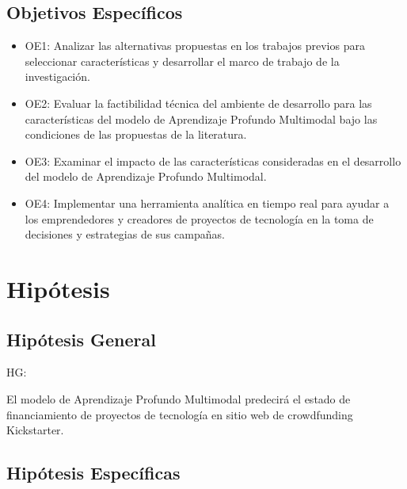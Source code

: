 \subsection{Objetivos Específicos}
\newcommand{\Objone}{
Analizar las alternativas propuestas en los trabajos previos para seleccionar características y desarrollar el marco de trabajo de la investigación.
}
\newcommand{\Objtwo}{
Evaluar la factibilidad técnica del ambiente de desarrollo para las características del modelo de Aprendizaje Profundo Multimodal bajo las condiciones de las propuestas de la literatura.
}
\newcommand{\Objthree}{
Examinar el impacto de las características consideradas en el desarrollo del modelo de Aprendizaje Profundo Multimodal.
}
\newcommand{\Objfour}{
Implementar una herramienta analítica en tiempo real para ayudar a los emprendedores y creadores de proyectos de tecnología en la toma de decisiones y estrategias de sus campañas.
}

\begin{itemize}
	\item OE1: {\Objone}
	\item OE2: {\Objtwo}
	\item OE3: {\Objthree}
	\item OE4: {\Objfour}
\end{itemize}

\section{Hipótesis}

\subsection{Hipótesis General}
HG: \newcommand{\HipotesisGeneral}{
	El modelo de Aprendizaje Profundo Multimodal predecirá el estado de financiamiento de proyectos de tecnología en sitio web de crowdfunding Kickstarter.
}
\HipotesisGeneral
\subsection{Hipótesis Específicas}
\newcommand{\Hone}{
El análisis de las alternativas propuestas en los trabajos previos influirá en la selección de características y desarrollo del marco de trabajo de la investigación.
}
\newcommand{\Htwo}{
La factibilidad técnica del ambiente de desarrollo para las características del modelo de Aprendizaje Profundo Multimodal determinará la aplicabilidad de las condiciones de las propuestas de la literatura.
}
\newcommand{\Hthree}{
El modelo de Aprendizaje Profundo Multimodal se verá afectado por las características consideradas en su desarrollo.
}
\newcommand{\Hfour}{
La herramienta analítica implementada ayudará en tiempo real a los emprendedores y creadores de proyectos de tecnología en la toma de decisiones y estrategias de sus campañas.
}

